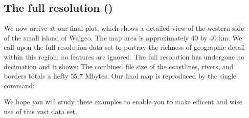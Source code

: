 

\subsection{The full resolution ()} 

We now arrive at our final plot, which shows a detailed view of
the western side of the small island of Waigeo.  The map area
is approximately 40 by 40 km.  We call upon the full resolution
data set to portray the richness of geographic detail within this
region; no features are ignored.  The full resolution has
undergone no decimation and it shows: The combined file size of
the coastlines, rivers, and borders totals a hefty 55.7 Mbytes.
Our final map is reproduced by the single command:

 


We hope you will study these examples to enable you to make
efficent and wise use of this vast data set.
